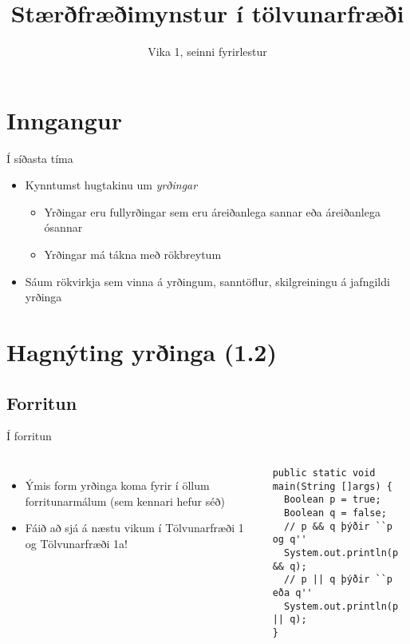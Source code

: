 \documentclass[handout]{beamer}
\title{Stærðfræðimynstur í tölvunarfræði}
\subtitle{Vika 1, seinni fyrirlestur}
\begin{document}
\begin{frame}
\titlepage
\end{frame}

\section{Inngangur}

\begin{frame}{Í síðasta tíma}
\begin{itemize}
 \item Kynntumst hugtakinu um \emph{yrðingar}
 \begin{itemize}
  \item Yrðingar eru fullyrðingar sem eru áreiðanlega sannar eða áreiðanlega ósannar
  \item Yrðingar má tákna með rökbreytum
 \end{itemize}
 \item Sáum rökvirkja sem vinna á yrðingum, sanntöflur, skilgreiningu á jafngildi yrðinga
\end{itemize}
\end{frame}

\section{Hagnýting yrðinga (1.2)}

\subsection{Forritun}

\begin{frame}[fragile]{Í forritun}
\begin{columns}
\begin{itemize}
 \item Ýmis form yrðinga koma fyrir í öllum forritunarmálum (sem kennari hefur séð)
 \item Fáið að sjá á næstu vikum í Tölvunarfræði 1 og Tölvunarfræði 1a!
\end{itemize}
\begin{verbatim}
public static void main(String []args) {
  Boolean p = true;
  Boolean q = false;
  // p && q þýðir ``p og q''
  System.out.println(p && q);
  // p || q þýðir ``p eða q''
  System.out.println(p || q);
}
\end{verbatim}

\end{columns}
\end{frame}
\end{document}
